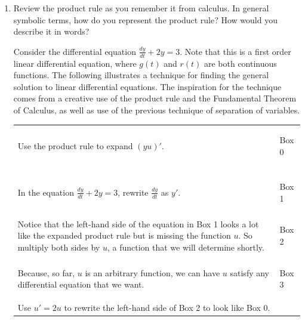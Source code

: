 \begin{enumerate}[resume]
\item Review the product rule as you remember it from calculus. In general symbolic terms, how do you represent the product rule? How would you describe it in words?
\vfill

Consider the differential equation $\displaystyle\frac{dy}{dt}+2y=3$. Note that this is a first order linear differential equation, where $g(t)$ and $r(t)$ are both continuous functions. The following illustrates a technique for finding the general solution to linear differential equations. The inspiration for the technique comes from a creative use of the product rule and the Fundamental Theorem of Calculus, as well as use of the previous technique of separation of variables.
\begin{center} \renewcommand{\arraystretch}{1.5}
\begin{tabular}{|p{2.5in}|V|}
\hline
Use the product rule to expand $(yu)'$. & \begin{flushright}{\footnotesize Box 0}\end{flushright} \\
{} & {} \\ 
\hline
In the equation $\frac{dy}{dt}+2y=3$, rewrite $\frac{dy}{dt}$ as $y'$.& \begin{flushright}{\footnotesize Box 1}\end{flushright} \\
\hline
Notice that the left-hand side of the equation in Box 1 looks a lot like the expanded product rule but is missing the function $u$.  So multiply both sides by $u$, a function that we will determine shortly.  & \begin{flushright}{\footnotesize Box 2}\end{flushright} \\
\hline
Because, so far, $u$ is an arbitrary function, we can have $u$ satisfy any differential equation that we want. & \begin{flushright}{\footnotesize Box 3}\end{flushright} \\
Use $u' = 2u$ to rewrite the left-hand side of Box 2 to look like Box 0. & {} \\
\hline
\end{tabular}\end{center}

\clearpage


\end{enumerate}
